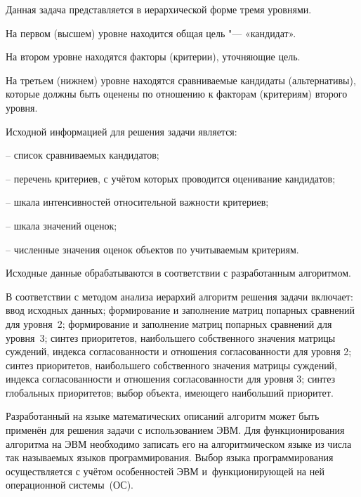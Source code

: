 Данная задача представляется в иерархической форме тремя уровнями.



На первом (высшем) уровне находится общая цель "--- «кандидат».



На втором уровне находятся факторы (критерии), уточняющие цель.



На третьем (нижнем) уровне находятся сравниваемые кандидаты (альтернативы), которые должны быть оценены по отношению к факторам (критериям) второго уровня.



Исходной информацией для решения задачи является:



 -- список сравниваемых кандидатов;



-- перечень критериев, с учётом которых проводится оценивание кандидатов;



-- шкала интенсивностей относительной важности критериев;



-- шкала значений оценок;



-- численные значения оценок объектов по учитываемым критериям.



Исходные данные обрабатываются в соответствии с разработанным алгоритмом.



В соответствии с методом анализа иерархий алгоритм решения задачи включает: ввод исходных данных; формирование и заполнение матриц попарных сравнений для уровня~2; формирование и заполнение матриц попарных сравнений для уровня~3; синтез приоритетов, наибольшего собственного значения матрицы суждений, индекса согласованности и отношения согласованности для уровня 2; синтез приоритетов, наибольшего собственного значения матрицы суждений, индекса согласованности и отношения согласованности для уровня 3; синтез глобальных приоритетов; выбор объекта, имеющего наибольший приоритет.



Разработанный на языке математических описаний алгоритм может быть применён для решения задачи с использованием ЭВМ. Для функционирования алгоритма на ЭВМ необходимо записать его на алгоритмическом языке из числа так называемых языков программирования. Выбор языка программирования осуществляется с учётом особенностей ЭВМ и~функционирующей на ней операционной системы~(ОС).



